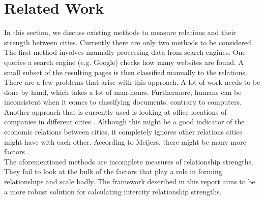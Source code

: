 \section{Related Work}
In this section, we discuss existing methods to measure relations and their strength between cities. Currently there are only two methods to be considered. \\

The first method involves manually processing data from search engines. One queries a search engine (e.g. Google) checks how many websites are found. A small subset of the resulting pages is then classified manually to the relations. There are a few problems that arise with this approach. A lot of work needs to be done by hand, which takes a lot of man-hours. Furthermore, humans can be inconsistent when it comes to classifying documents, contrary to computers. \\

Another approach that is currently used is looking at office locations of companies in different cities \cite{derudder2010intercity}. Although this might be a good indicator of the economic relations between cities, it completely ignores other relations cities might have with each other. According to Meijers, there might be many more factors \cite{meijers2007synergy}.\\

The aforementioned methods are incomplete measures of relationship strengths. They fail to look at the bulk of the factors that play a role in forming relationships and scale badly. The framework described in this report aims to be a more robust solution for calculating intercity relationship strengths.
